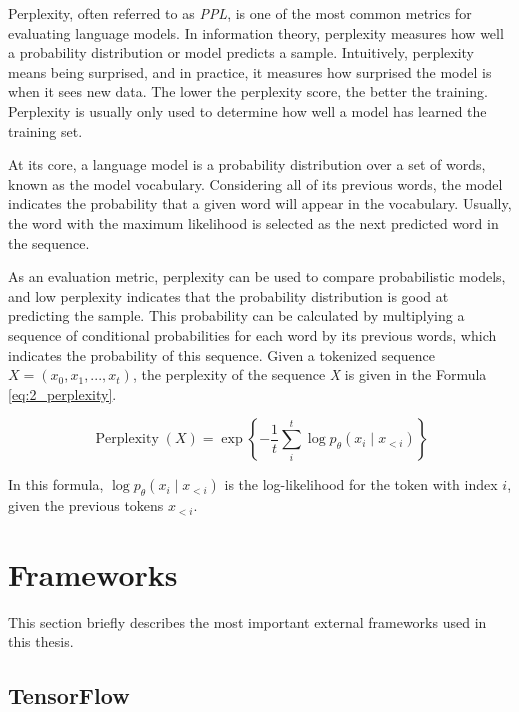     Perplexity, often referred to as \textit{PPL}, is one of the most common metrics for evaluating language models. In information theory, perplexity measures how well a probability distribution or model predicts a sample. Intuitively, perplexity means being surprised, and in practice, it measures how surprised the model is when it sees new data. The lower the perplexity score, the better the training. Perplexity is usually only used to determine how well a model has learned the training set. 

    At its core, a language model is a probability distribution over a set of words, known as the model vocabulary. Considering all of its previous words, the model indicates the probability that a given word will appear in the vocabulary. Usually, the word with the maximum likelihood is selected as the next predicted word in the sequence.

    As an evaluation metric, perplexity can be used to compare probabilistic models, and low perplexity indicates that the probability distribution is good at predicting the sample. This probability can be calculated by multiplying a sequence of conditional probabilities for each word by its previous words, which indicates the probability of this sequence.
    Given a tokenized sequence $X = (x_0, x_1, ..., x_t)$, the perplexity of the sequence \textit{X} is given in the Formula \ref{eq:2_perplexity}.
        

    \begin{equation}
    \operatorname{Perplexity}(X)=\exp \left\{-\frac{1}{t} \sum_i^t \log p_\theta\left(x_i \mid x_{<i}\right)\right\}
    \label{eq:2_perplexity}
    \end{equation}

    In this formula, $\log p_\theta\left(x_i \mid x_{<i}\right)$ is the log-likelihood for the token with index $i$, given the previous tokens $x_{<i}$.

\section{Frameworks}
    This section briefly describes the most important external frameworks used in this thesis.
    
    \subsection{TensorFlow}
    
